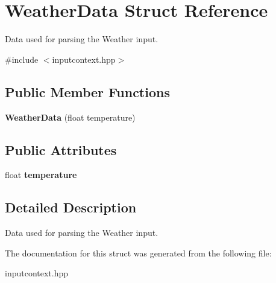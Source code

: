 \hypertarget{structWeatherData}{}\section{Weather\+Data Struct Reference}
\label{structWeatherData}


Data used for parsing the Weather input.  




{\ttfamily \#include $<$inputcontext.\+hpp$>$}

\subsection*{Public Member Functions}
\begin{DoxyCompactItemize}
\item 
\mbox{\label{structWeatherData_a9775ece73c6ac6082cf7edba50e4bd47}} 
{\bfseries Weather\+Data} (float temperature)
\end{DoxyCompactItemize}
\subsection*{Public Attributes}
\begin{DoxyCompactItemize}
\item 
\mbox{\label{structWeatherData_a9b81dcf968ae2f54d349ffc3101b6fdd}} 
float {\bfseries temperature}
\end{DoxyCompactItemize}


\subsection{Detailed Description}
Data used for parsing the Weather input. 

The documentation for this struct was generated from the following file\+:\begin{DoxyCompactItemize}
\item 
inputcontext.\+hpp\end{DoxyCompactItemize}
